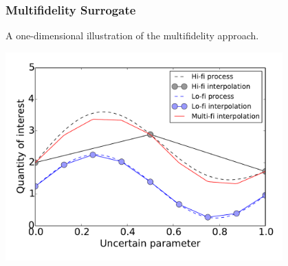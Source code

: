 \documentclass[11pt,ucs]{beamer}
\begin{document}
\begin{frame}\frametitle{Multifidelity Surrogate}

A one-dimensional illustration of the multifidelity approach.

\begin{center}
\includegraphics[width=0.8\textwidth]{method2}
\end{center}


\end{frame}
\end{document}
